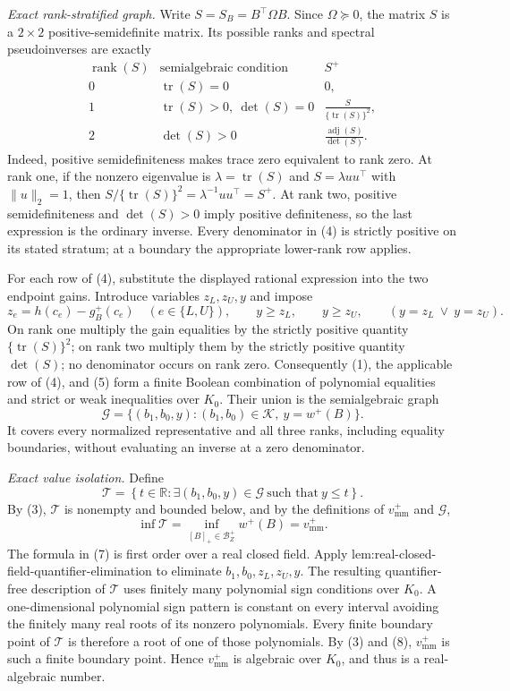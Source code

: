 \emph{Exact rank-stratified graph.}
Write \(S=S_B=B^{\top}\Omega B\).  Since \(\Omega\succeq0\), the matrix \(S\) is a \(2\times2\) positive-semidefinite matrix.  Its possible ranks and spectral pseudoinverses are exactly
\[
\begin{array}{c|c|c}
\operatorname{rank}(S)&\text{semialgebraic condition}&S^+\\ \hline
0&\operatorname{tr}(S)=0&0,\\[2mm]
1&\operatorname{tr}(S)>0,\ \det(S)=0&
\displaystyle\frac{S}{\{\operatorname{tr}(S)\}^2},\\[3mm]
2&\det(S)>0&
\displaystyle\frac{\operatorname{adj}(S)}{\det(S)}.
\end{array}
\tag{4}
\]
Indeed, positive semidefiniteness makes trace zero equivalent to rank zero.  At rank one, if the nonzero eigenvalue is \(\lambda=\operatorname{tr}(S)\) and \(S=\lambda uu^{\top}\) with \(\lVert u\rVert_2=1\), then \(S/\{\operatorname{tr}(S)\}^2=\lambda^{-1}uu^{\top}=S^+\).  At rank two, positive semidefiniteness and \(\det(S)>0\) imply positive definiteness, so the last expression is the ordinary inverse.  Every denominator in (4) is strictly positive on its stated stratum; at a boundary the appropriate lower-rank row applies.

For each row of (4), substitute the displayed rational expression into the two endpoint gains.  Introduce variables \(z_L,z_U,y\) and impose
\[
z_e=h(c_e)-g_B^+(c_e)\quad(e\in\{L,U\}),
\qquad y\ge z_L,
\qquad y\ge z_U,
\qquad (y=z_L\ \vee\ y=z_U).
\tag{5}
\]
On rank one multiply the gain equalities by the strictly positive quantity \(\{\operatorname{tr}(S)\}^2\); on rank two multiply them by the strictly positive quantity \(\det(S)\); no denominator occurs on rank zero.  Consequently (1), the applicable row of (4), and (5) form a finite Boolean combination of polynomial equalities and strict or weak inequalities over \(K_0\).  Their union is the semialgebraic graph
\[
\mathcal G=
\{(b_1,b_0,y):(b_1,b_0)\in\mathcal K,\ y=w^+(B)\}.
\tag{6}
\]
It covers every normalized representative and all three ranks, including equality boundaries, without evaluating an inverse at a zero denominator.

\emph{Exact value isolation.}
Define
\[
\mathcal T=
\left\{t\in\mathbb R:
\exists(b_1,b_0,y)\in\mathcal G\ \text{such that}\ y\le t
\right\}.
\tag{7}
\]
By (3), \(\mathcal T\) is nonempty and bounded below, and by the definitions of \(v_{\mathrm{mm}}^+\) and \(\mathcal G\),
\[
\inf\mathcal T
=\inf_{[B]_+\in\mathcal B_Z^+}w^+(B)
=v_{\mathrm{mm}}^+.
\tag{8}
\]
The formula in (7) is first order over a real closed field.  Apply lem:real-closed-field-quantifier-elimination to eliminate \(b_1,b_0,z_L,z_U,y\).  The resulting quantifier-free description of \(\mathcal T\) uses finitely many polynomial sign conditions over \(K_0\).  A one-dimensional polynomial sign pattern is constant on every interval avoiding the finitely many real roots of its nonzero polynomials.  Every finite boundary point of \(\mathcal T\) is therefore a root of one of those polynomials.  By (3) and (8), \(v_{\mathrm{mm}}^+\) is such a finite boundary point.  Hence \(v_{\mathrm{mm}}^+\) is algebraic over \(K_0\), and thus is a real-algebraic number.

